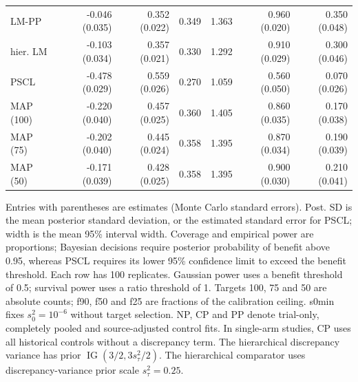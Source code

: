 \begin{landscape}
\begin{longtable}{lrrrrrr}
LM-PP & -0.046 (0.035) & 0.352 (0.022) & 0.349 & 1.363 & 0.960 (0.020) & 0.350 (0.048) \\
hier. LM & -0.103 (0.034) & 0.357 (0.021) & 0.330 & 1.292 & 0.910 (0.029) & 0.300 (0.046) \\
PSCL & -0.478 (0.029) & 0.559 (0.026) & 0.270 & 1.059 & 0.560 (0.050) & 0.070 (0.026) \\
MAP (100) & -0.220 (0.040) & 0.457 (0.025) & 0.360 & 1.405 & 0.860 (0.035) & 0.170 (0.038) \\
MAP (75) & -0.202 (0.040) & 0.445 (0.024) & 0.358 & 1.395 & 0.870 (0.034) & 0.190 (0.039) \\
MAP (50) & -0.171 (0.039) & 0.428 (0.025) & 0.358 & 1.395 & 0.900 (0.030) & 0.210 (0.041) \\
\end{longtable}
\noindent\begin{minipage}{\linewidth}\footnotesize Entries with parentheses are estimates (Monte Carlo standard errors). Post. SD is the mean posterior standard deviation, or the estimated standard error for PSCL; width is the mean 95\% interval width. Coverage and empirical power are proportions; Bayesian decisions require posterior probability of benefit above 0.95, whereas PSCL requires its lower 95\% confidence limit to exceed the benefit threshold. Each row has 100 replicates. Gaussian power uses a benefit threshold of 0.5; survival power uses a ratio threshold of 1. Targets 100, 75 and 50 are absolute counts; f90, f50 and f25 are fractions of the calibration ceiling. s0min fixes $s_0^2=10^{-6}$ without target selection. NP, CP and PP denote trial-only, completely pooled and source-adjusted control fits. In single-arm studies, CP uses all historical controls without a discrepancy term. The hierarchical discrepancy variance has prior $\operatorname{IG}(3/2,3s_\tau^2/2)$. The hierarchical comparator uses discrepancy-variance prior scale $s_\tau^2=0.25$.\end{minipage}
\endgroup
\end{landscape}
